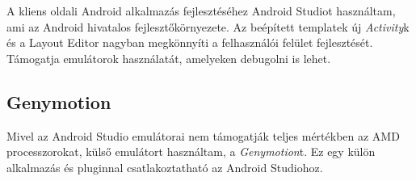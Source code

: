 A kliens oldali Android alkalmazás fejlesztéséhez Android Studiot használtam, ami az Android hivatalos fejlesztőkörnyezete. Az beépített templatek új \emph{Activity}k és a Layout Editor nagyban megkönnyíti a felhasználói felület fejlesztését. Támogatja emulátorok használatát, amelyeken debugolni is lehet.

\subsection{Genymotion}

Mivel az Android Studio emulátorai nem támogatják teljes mértékben az AMD processzorokat, külső emulátort használtam, a \emph{Genymotion}t. Ez egy külön alkalmazás és pluginnal csatlakoztatható az Android Studiohoz.

